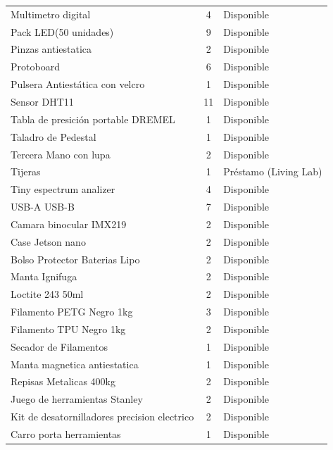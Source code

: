 \begin{longtable}{p{8.5cm} c l}
  Multimetro digital & 4 & \cellcolor{verdeOk} Disponible \\
  Pack LED(50 unidades) & 9 & \cellcolor{verdeOk} Disponible \\
  Pinzas antiestatica & 2 & \cellcolor{verdeOk} Disponible \\
  Protoboard & 6 & \cellcolor{verdeOk} Disponible \\
  Pulsera Antiestática con velcro & 1 & \cellcolor{verdeOk} Disponible \\
  Sensor DHT11 & 11 & \cellcolor{verdeOk} Disponible \\
  Tabla de presición portable DREMEL & 1 & \cellcolor{verdeOk} Disponible \\
  Taladro de Pedestal & 1 & \cellcolor{verdeOk} Disponible \\
  Tercera Mano con lupa & 2 & \cellcolor{verdeOk} Disponible \\
  Tijeras & 1 & \cellcolor{azulPrestamo} Préstamo (Living Lab) \\
  Tiny espectrum analizer & 4 & \cellcolor{verdeOk} Disponible \\
  USB-A USB-B & 7 & \cellcolor{verdeOk} Disponible \\
  Camara binocular IMX219 & 2 & \cellcolor{verdeOk} Disponible \\
  Case Jetson nano & 2 & \cellcolor{verdeOk} Disponible \\
  Bolso Protector Baterias Lipo & 2 & \cellcolor{verdeOk} Disponible \\
  Manta Ignifuga & 2 & \cellcolor{verdeOk} Disponible \\
  Loctite 243 50ml & 2 & \cellcolor{verdeOk} Disponible \\
  Filamento PETG Negro 1kg & 3 & \cellcolor{verdeOk} Disponible \\
  Filamento TPU Negro 1kg & 2 & \cellcolor{verdeOk} Disponible \\
  Secador de Filamentos & 1 & \cellcolor{verdeOk} Disponible \\
  Manta magnetica antiestatica & 1 & \cellcolor{verdeOk} Disponible \\
  Repisas Metalicas 400kg & 2 & \cellcolor{verdeOk} Disponible \\
  Juego de herramientas Stanley & 2 & \cellcolor{verdeOk} Disponible \\
  Kit de desatornilladores precision electrico & 2 & \cellcolor{verdeOk} Disponible \\
  Carro porta herramientas & 1 & \cellcolor{verdeOk} Disponible \\

\end{longtable}
